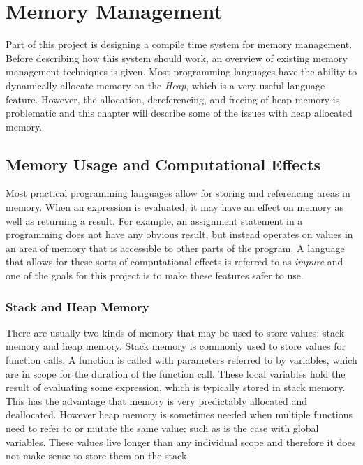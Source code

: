 \chapter{Memory Management}\label{sec:motivation} 
Part of this project is designing a compile time system for memory management.
Before describing how this system should work, an overview of existing memory
management techniques is given. Most programming languages have the ability to
dynamically allocate memory on the \textit{Heap}, which is a very useful
language feature.  However, the allocation, dereferencing, and freeing of heap
memory is problematic and this chapter will describe some of the issues with
heap allocated memory.

\section{Memory Usage and Computational Effects}
Most practical programming languages allow for storing and referencing areas
in memory. When an expression is evaluated, it may have an effect on memory as
well as returning a result. For example, an assignment statement in a programming
does not have any obvious result, but instead operates on values in an area of
memory that is accessible to other parts of the program. A language that allows
for these sorts of computational effects is referred to as \textit{impure} and
one of the goals for this project is to make these features safer to use.

\subsection{Stack and Heap Memory}
There are usually two kinds of memory that may be used to store values: stack
memory and heap memory. Stack memory is commonly used to store values for
function calls. A function is called with parameters referred to by variables,
which are in scope for the duration of the function call. These local variables
hold the result of evaluating some expression, which is typically stored in
stack memory. This has the advantage that memory is very predictably allocated
and deallocated. However heap memory is sometimes needed when multiple functions
need to refer to or mutate the same value; such as is the case with global
variables. These values live longer than any individual scope and therefore
it does not make sense to store them on the stack.

